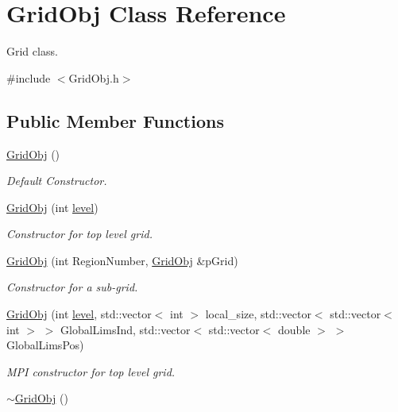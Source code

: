 \hypertarget{class_grid_obj}{}\section{Grid\+Obj Class Reference}
\label{class_grid_obj}


Grid class.  




{\ttfamily \#include $<$Grid\+Obj.\+h$>$}

\subsection*{Public Member Functions}
\begin{DoxyCompactItemize}
\item 
\hyperlink{class_grid_obj_acc3416599b59236e87b6b60a07e678af}{Grid\+Obj} ()
\begin{DoxyCompactList}\small\item\em Default Constructor. \end{DoxyCompactList}\item 
\hyperlink{class_grid_obj_aaadde3417da5f31e1b8b33635487b56e}{Grid\+Obj} (int \hyperlink{class_grid_obj_a7dfedc4442a386ec15c8b03ca899c1a9}{level})
\begin{DoxyCompactList}\small\item\em Constructor for top level grid. \end{DoxyCompactList}\item 
\hyperlink{class_grid_obj_a40600a8b8a286b8299bca8265b62f51b}{Grid\+Obj} (int Region\+Number, \hyperlink{class_grid_obj}{Grid\+Obj} \&p\+Grid)
\begin{DoxyCompactList}\small\item\em Constructor for a sub-\/grid. \end{DoxyCompactList}\item 
\hyperlink{class_grid_obj_abc1ce149816c2f96870a859ce28c598d}{Grid\+Obj} (int \hyperlink{class_grid_obj_a7dfedc4442a386ec15c8b03ca899c1a9}{level}, std\+::vector$<$ int $>$ local\+\_\+size, std\+::vector$<$ std\+::vector$<$ int $>$ $>$ Global\+Lims\+Ind, std\+::vector$<$ std\+::vector$<$ double $>$ $>$ Global\+Lims\+Pos)
\begin{DoxyCompactList}\small\item\em M\+PI constructor for top level grid. \end{DoxyCompactList}\item 
\hyperlink{class_grid_obj_ace563099d85c330ac48f35b515422522}{$\sim$\+Grid\+Obj} ()

\end{DoxyCompactItemize}
